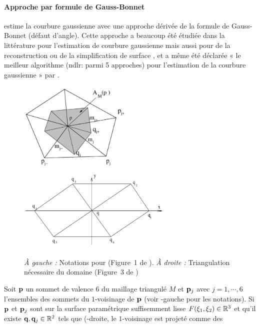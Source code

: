 \paragraph{Approche par formule de Gauss-Bonnet}
%
 estime la courbure gaussienne avec une approche dérivée de
la formule de Gauss-Bonnet (défaut d'angle). Cette approche a beaucoup été
étudiée dans la littérature pour l'estimation de courbure gaussienne
\cite{Meek2000, Stokely1992} mais aussi pour de la reconstruction \cite{Dyn2001}
ou de la simplification de surface \cite{Kim2002}, et a même été déclarée « le
meilleur algorithme (ndlr: parmi 5 approches) pour l'estimation de la courbure
gaussienne » par .
%
\begin{figure}[ht]
    \begin{center}
      \includegraphics[width=5.5cm]{images/Curvature/Notations_Xu}
      \includegraphics[width=7.5cm]{images/Curvature/Notations_Xu_2}
    \end{center}
    \caption[Notations pour .]{\emph{À gauche :} Notations pour  (Figure~1 de \cite{Xu2006}). \emph{À droite :} Triangulation nécessaire du domaine (Figure~3 de \cite{Xu2006})}
    \label{fig:xu_notations}
\end{figure}
%
Soit $\mathbf{p}$ un sommet de valence $6$ du maillage triangulé $M$ et $\mathbf{p}_j$ avec
$j = 1,\cdots, 6$ l'ensembles des sommets du $1$-voisinage de $\mathbf{p}$ (voir
-gauche pour les notations). Si $\mathbf{p}$ et $\mathbf{p}_j$
sont sur la surface paramétrique suffisemment lisse $F(\xi_1,\xi_2) \in \mathbb{R}^3$ et
qu'il existe $\mathbf{q}, \mathbf{q}_j \in \mathbb{R}^2$ tels que
(-droite, le $1$-voisinage est projeté comme des
